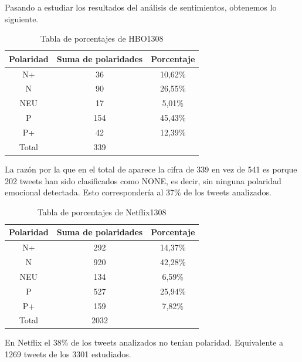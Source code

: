 Pasando a estudiar los resultados del análisis de sentimientos, obtenemos lo siguiente. 

\begin{table}[H]
	\centering
	\begin{tabular}{|c|c|c|}
		\hline 
		Polaridad& Suma de polaridades & Porcentaje \\ 
		\hline 
		N+& 36 & 10,62\% \\ 
		\hline 
		N& 90 &  26,55\%\\ 
		\hline 
		NEU& 17 & 5,01\% \\ 
		\hline 
		P& 154 & 45,43\% \\ 
		\hline 
		P+& 42 & 12,39\% \\ 
		\hline 
		Total & 339 & \\
		\hline
	\end{tabular} 
	\caption{Tabla de porcentajes de HBO1308}
	\label{tbl:porcentaje-HBO1308}
\end{table}



La razón por la que en el total de aparece la cifra de 339 en vez de 541 es porque 202 tweets han sido clasificados como NONE, es decir, sin ninguna polaridad emocional detectada. Esto correspondería al 37\% de los tweets analizados.

\begin{table}[H]
	\centering
	\begin{tabular}{|c|c|c|}
		\hline 
		Polaridad& Suma de polaridades & Porcentaje \\ 
		\hline 
		N+& 292 & 14,37\% \\ 
		\hline 
		N& 920 &  42,28\%\\ 
		\hline 
		NEU& 134 & 6,59\% \\ 
		\hline 
		P& 527 & 25,94\% \\ 
		\hline 
		P+& 159 & 7,82\% \\ 
		\hline 
		Total & 2032 & \\
		\hline
		
	\end{tabular} 
	\caption{Tabla de porcentajes de Netflix1308}
	\label{tbl:porcentaje-Netflix1308}
\end{table}
\begin{figure}[H]
	
\end{figure}



En Netflix el 38\% de los tweets analizados no tenían polaridad. Equivalente a 1269 tweets de los 3301 estudiados. 

